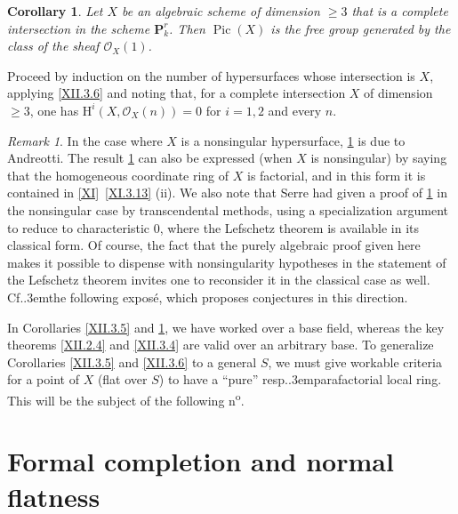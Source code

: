 \documentclass[11pt,a4paper,oneside]{book}
\providecommand{\pageoriginale}{%
  \refstepcounter{pageoriginal}%
  \marginpar{\raggedright\footnotesize\bfseries\thepageoriginal}%
  \xspace}
\providecommand{\og}{``}
\providecommand{\fg}{''\xspace}
\providecommand{\Cf}{Cf.\kern.3em}
\providecommand{\resp}{resp.\kern.3em}
\providecommand{\PP}{\mathbf P}
\providecommand{\OX}{\mathcal O_X}
\providecommand{\Pic}{\operatorname{Pic}}
\renewcommand{\H}{\mathrm H}
\theoremstyle{plain}
\newtheorem{corollaire}[subsection]{Corollary}
\theoremstyle{definition}
\theoremstyle{remark}
\newtheorem{remarque}[subsection]{Remark}
\renewcommand{\Ref}[1]{\textup{\ref{#1}}}
\begin{document}
\begin{corollaire} \label{XII.3.7} Let $X$ be an algebraic scheme of dimension $\geq 3$ that is a complete intersection in the scheme $\PP_k^r$. Then $\Pic(X)$ is the free group generated by the class of the sheaf $\OX(1)$.
\end{corollaire}
Proceed by induction on the number of hypersurfaces whose intersection is $X$, applying \Ref{XII.3.6} and noting that, for a complete intersection $X$ of dimension $\geq 3$, one has $\H^i(X, \OX(n))=0$ for $i=1,2$ and every $n$.

\begin{remarque} \label{XII.3.8}
In\pageoriginale the case where $X$ is a nonsingular hypersurface, \Ref{XII.3.7} is due to Andreotti. The result \Ref{XII.3.7} can also be expressed (when $X$ is nonsingular) by saying that the homogeneous coordinate ring of $X$ is factorial, and in this form it is contained in \Ref{XI}~\Ref{XI.3.13} (ii). We also note that Serre had given a proof of \Ref{XII.3.7} in the nonsingular case by transcendental methods, using a specialization argument to reduce to characteristic 0, where the Lefschetz theorem is available in its classical form. Of course, the fact that the purely algebraic proof given here makes it possible to dispense with nonsingularity hypotheses in the statement of the Lefschetz theorem invites one to reconsider it in the classical case as well. \Cf the following expos\'e, which proposes conjectures in this direction.

In Corollaries \Ref{XII.3.5} and \Ref{XII.3.7}, we have worked over a base field, whereas the key theorems \Ref{XII.2.4} and \Ref{XII.3.4} are valid over an arbitrary base. To generalize Corollaries \Ref{XII.3.5} and \Ref{XII.3.6} to a general $S$, we must give workable criteria for a point of $X$ (flat over $S$) to have a \og pure\fg \resp parafactorial local ring. This will be the subject of the following n\textsuperscript{o}.
\end{remarque}

\section{Formal completion and normal flatness} \label{XII.4}

\setcounter{equation}{18}
\end{document}
